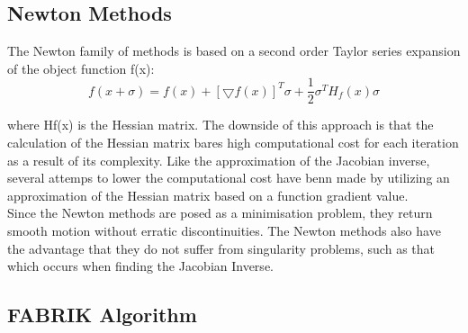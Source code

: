 \subsection{Newton Methods}
The Newton family of methods is based on a second order Taylor series expansion of the object function f(x):
\begin{equation}
f(x+\sigma)= f(x)+ [\bigtriangledown f(x)]^{T}\sigma + \frac{1}{2}\sigma^{T}H_{f}(x)\sigma
\end{equation}

where Hf(x) is the Hessian matrix. The downside of this approach is that the calculation of the Hessian matrix bares high computational cost for each iteration as a result of its complexity. Like the approximation of the Jacobian inverse, several attemps to lower the computational cost have benn made by utilizing an approximation of the Hessian matrix based on a function gradient value.\\
Since the Newton methods are posed as a minimisation problem, they return smooth motion without erratic discontinuities.
The Newton methods also have the advantage that they do not suffer from singularity problems, such as that which occurs when finding the Jacobian Inverse.


\subsection{FABRIK Algorithm}

